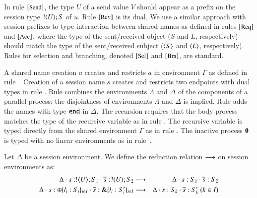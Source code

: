 In rule ${\footnotesize[\textrm{\small Send}]}$, 
the type $U$ of a send value $V$ should appear as a prefix
on the session type $! \langle U \rangle ; S$ of $u$.
Rule ${\footnotesize[\textrm{\small Rcv}]}$ is its dual.  
We use a similar approach with session prefixes
to type interaction between shared names as defined 
in rules ${\footnotesize[\textrm{\small Req}]}$ and ${\footnotesize[\textrm{\small Acc}]}$,
where the type of the sent/received object 
($S$ and $L$, respectively) should
match the type of the sent/received subject
($\langle S \rangle$ and $\langle L \rangle$, respectively).
Rules for selection and branching, denoted
${\footnotesize[\textrm{\small Sel}]}$ and ${\footnotesize[\textrm{\small Bra}]}$, are standard. 
%

A
shared name creation $a$ creates and restricts
$a$ in environment $\Gamma$ as defined in 
rule~. 
Creation of a session name $s$
creates and restricts two endpoints with dual types 
in rule . 
Rule  
combines the environments
$\Lambda$ and $\Delta$ of
the components of a parallel process;
the disjointness of environments $\Lambda$ and $\Delta$
is implied. Rule  adds 
the names with type $\mathtt{end}$ in $\Delta$.  
The recursion requires that the body process 
matches the type of the recursive
variable as in rule .
The recursive variable is typed
directly from the shared environment $\Gamma$ as
in rule .
The inactive process $\mathbf{0}$ is typed with no
linear environments as in rule~. 


\begin{definition}\label{d:wtenvred}%
	Let $\Delta$ be a session environment.
	We define the reduction relation $\longrightarrow$ on session environments as: %
\begin{eqnarray*}
	\Delta \cat s: \btout{U} S_1 \cat \dual{s}: \btinp{U} S_2  & \red & 
	\Delta \cat s: S_1 \cat \dual{s}: S_2  \\
	\Delta \cat s: \btsel{l_i: S_i}_{i \in I} \cat \dual{s}: \btbra{l_i: S_i'}_{i \in I} &\red& \Delta \cat s: S_k \cat \dual{s}: S_k' \ (k \in I)
\end{eqnarray*}
\end{definition}


